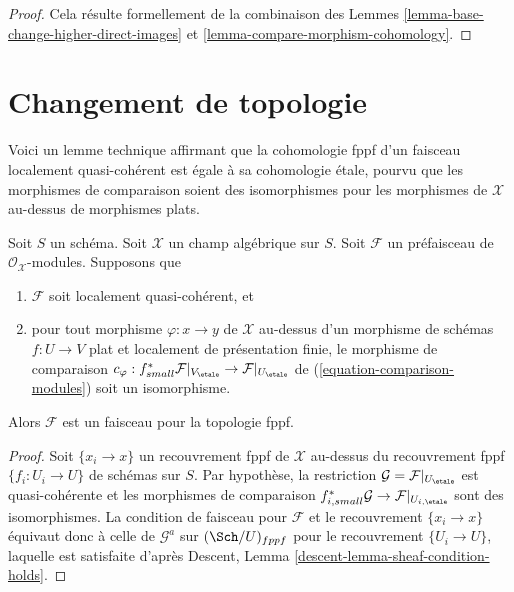 \begin{proof}
Cela résulte formellement de la combinaison des
Lemmes \ref{lemma-base-change-higher-direct-images} et
\ref{lemma-compare-morphism-cohomology}.
\end{proof}











\section{Changement de topologie}
\label{section-change-topology}

\noindent
Voici un lemme technique affirmant que la cohomologie fppf
d'un faisceau localement quasi-cohérent est égale à sa cohomologie
étale, pourvu que les morphismes de comparaison soient des isomorphismes
pour les morphismes de $\mathcal{X}$ au-dessus de morphismes plats.

\begin{lemma}
\label{lemma-lqc-flat-base-change-fppf-sheaf}
Soit $S$ un schéma. Soit $\mathcal{X}$ un champ algébrique sur $S$.
Soit $\mathcal{F}$ un préfaisceau de $\mathcal{O}_\mathcal{X}$-modules.
Supposons que
\begin{enumerate}
\item[(a)] $\mathcal{F}$ soit localement quasi-cohérent, et
\item[(b)] pour tout morphisme $\varphi : x \to y$ de $\mathcal{X}$ au-dessus
d'un morphisme de schémas $f : U \to V$ plat et
localement de présentation finie, le morphisme de comparaison
$c_\varphi : f_{small}^*\mathcal{F}|_{V_\etale} \to
\mathcal{F}|_{U_\etale}$ de
(\ref{equation-comparison-modules}) soit un isomorphisme.
\end{enumerate}
Alors $\mathcal{F}$ est un faisceau pour la topologie fppf.
\end{lemma}

\begin{proof}
Soit $\{x_i \to x\}$ un recouvrement fppf de $\mathcal{X}$ au-dessus du
recouvrement fppf $\{f_i : U_i \to U\}$ de schémas sur $S$.
Par hypothèse, la restriction $\mathcal{G} = \mathcal{F}|_{U_\etale}$
est quasi-cohérente et les morphismes de comparaison
$f_{i, small}^*\mathcal{G} \to \mathcal{F}|_{U_{i, \etale}}$
sont des isomorphismes. La condition de faisceau pour $\mathcal{F}$
et le recouvrement $\{x_i \to x\}$ équivaut donc à celle de
$\mathcal{G}^a$ sur $(\Sch/U)_{fppf}$ pour le recouvrement $\{U_i \to U\}$,
laquelle est satisfaite d'après
Descent, Lemma \ref{descent-lemma-sheaf-condition-holds}.
\end{proof}

